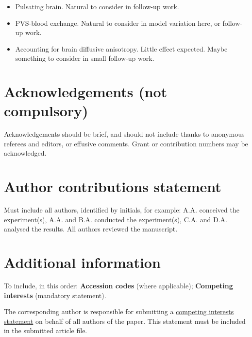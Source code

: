\documentclass[fleqn,10pt]{wlscirep}
\begin{document}
\begin{itemize}
    \item Pulsating brain. Natural to consider in follow-up work.
    \item PVS-blood exchange. Natural to consider in model variation here, or follow-up work.
    \item Accounting for brain diffusive anisotropy. Little effect expected. Maybe something to consider in small follow-up work.
\end{itemize}



\newpage
\section*{Acknowledgements (not compulsory)}

Acknowledgements should be brief, and should not include thanks to anonymous referees and editors, or effusive comments. Grant or contribution numbers may be acknowledged.

\section*{Author contributions statement}

Must include all authors, identified by initials, for example:
A.A. conceived the experiment(s),  A.A. and B.A. conducted the experiment(s), C.A. and D.A. analysed the results.  All authors reviewed the manuscript. 

\section*{Additional information}

To include, in this order: \textbf{Accession codes} (where applicable); \textbf{Competing interests} (mandatory statement). 

The corresponding author is responsible for submitting a \href{http://www.nature.com/srep/policies/index.html#competing}{competing interests statement} on behalf of all authors of the paper. This statement must be included in the submitted article file.
\end{document}
